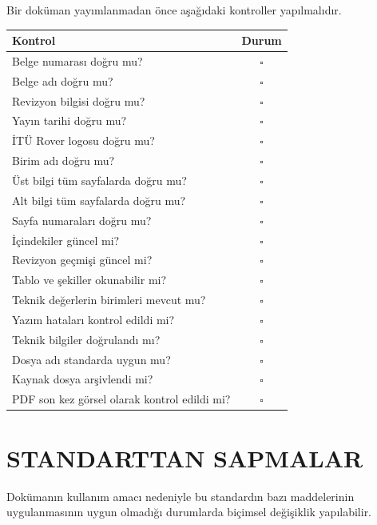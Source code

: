 \documentclass[11pt,a4paper]{article}
\begin{document}
Bir doküman yayımlanmadan önce aşağıdaki kontroller yapılmalıdır.

\begin{tabularx}{\textwidth}{|X|c|}
\hline
\textbf{Kontrol} & \textbf{Durum} \\
\hline
Belge numarası doğru mu? & $\square$ \\
\hline
Belge adı doğru mu? & $\square$ \\
\hline
Revizyon bilgisi doğru mu? & $\square$ \\
\hline
Yayın tarihi doğru mu? & $\square$ \\
\hline
İTÜ Rover logosu doğru mu? & $\square$ \\
\hline
Birim adı doğru mu? & $\square$ \\
\hline
Üst bilgi tüm sayfalarda doğru mu? & $\square$ \\
\hline
Alt bilgi tüm sayfalarda doğru mu? & $\square$ \\
\hline
Sayfa numaraları doğru mu? & $\square$ \\
\hline
İçindekiler güncel mi? & $\square$ \\
\hline
Revizyon geçmişi güncel mi? & $\square$ \\
\hline
Tablo ve şekiller okunabilir mi? & $\square$ \\
\hline
Teknik değerlerin birimleri mevcut mu? & $\square$ \\
\hline
Yazım hataları kontrol edildi mi? & $\square$ \\
\hline
Teknik bilgiler doğrulandı mı? & $\square$ \\
\hline
Dosya adı standarda uygun mu? & $\square$ \\
\hline
Kaynak dosya arşivlendi mi? & $\square$ \\
\hline
PDF son kez görsel olarak kontrol edildi mi? & $\square$ \\
\hline
\end{tabularx}


\newpage

\section{STANDARTTAN SAPMALAR}

Dokümanın kullanım amacı nedeniyle bu standardın bazı maddelerinin
uygulanmasının uygun olmadığı durumlarda biçimsel değişiklik yapılabilir.
\end{document}
